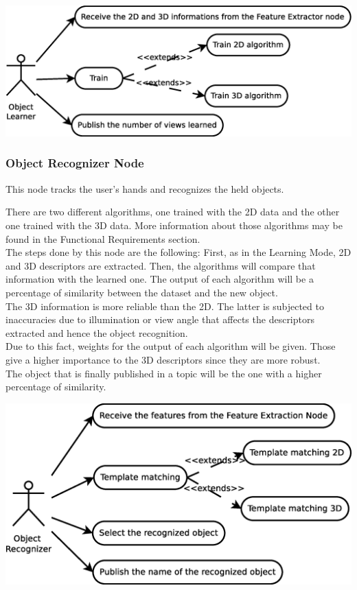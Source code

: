 \documentclass{article}
\begin{document}
\begin{center}

		\includegraphics[scale=0.4]{img/diagrams/uc_learner.eps}
	\end{center}

\subsubsection{Object Recognizer Node} 
\hspace{0.5cm}This node tracks the user's hands and recognizes the held objects. 

There are two different algorithms, one trained with the 2D data and the other one trained with the 3D data. More information about those algorithms may be found in the Functional Requirements section. 
\\
The steps done by this node are the following: 
First, as in the Learning Mode, 2D and 3D descriptors are extracted. Then, the algorithms will compare that information with the learned one. 
The output of each algorithm will be a percentage of similarity between the dataset and the new object. 
\\
The 3D information is more reliable than the 2D. The latter is subjected to inaccuracies due to illumination or view angle that affects the descriptors extracted and hence the object recognition.
\\
Due to this fact, weights for the output of each algorithm will be given. Those give a higher importance to the 3D descriptors since they are more robust. 
\\
The object that is finally published in a topic will be the one with a higher percentage of similarity. 

\begin{center}
	\includegraphics[scale=0.4]{img/diagrams/uc_recognizer.eps}
\end{center}
\end{document}
